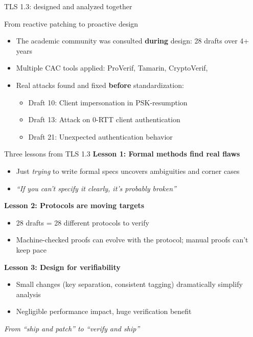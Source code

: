 \ifdefined\PRESENTATION\else\PassOptionsToClass{handout}{beamer}\fi\documentclass[aspectratio=169, lualatex]{beamer}
\begin{document}
\begin{frame}{TLS 1.3: designed and analyzed together}
	\begin{center}
		\Large
		From reactive patching to proactive design
	\end{center}
	\vspace{0.5em}
	\begin{itemize}
		\item The academic community was consulted \textbf{during} design: 28 drafts over 4+ years
		\item Multiple CAC tools applied: ProVerif, Tamarin, CryptoVerif, \fstar
		\item Real attacks found and fixed \textbf{before} standardization:
		      \begin{itemize}
			      \item Draft 10: Client impersonation in PSK-resumption
			      \item Draft 13: Attack on 0-RTT client authentication
			      \item Draft 21: Unexpected authentication behavior
		      \end{itemize}
	\end{itemize}
\end{frame}

\begin{frame}{Three lessons from TLS 1.3}
	\textbf{Lesson 1: Formal methods find real flaws}
	\begin{itemize}
		\item Just \textit{trying} to write formal specs uncovers ambiguities and corner cases
		\item \textit{``If you can't specify it clearly, it's probably broken''}
	\end{itemize}
	\vspace{0.3em}
	\textbf{Lesson 2: Protocols are moving targets}
	\begin{itemize}
		\item 28 drafts = 28 different protocols to verify
		\item Machine-checked proofs can evolve with the protocol; manual proofs can't keep pace
	\end{itemize}
	\vspace{0.3em}
	\textbf{Lesson 3: Design for verifiability}
	\begin{itemize}
		\item Small changes (key separation, consistent tagging) dramatically simplify analysis
		\item Negligible performance impact, huge verification benefit
	\end{itemize}
	\vspace{0.3em}
	\begin{center}
		\textit{From ``ship and patch'' to ``verify and ship''}
	\end{center}
\end{frame}
\end{document}
